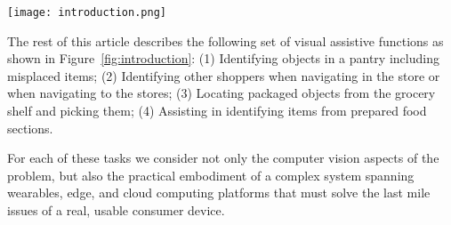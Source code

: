 \begin{figure*}[!htb]
\centering
\texttt{[image: introduction.png]}
\caption{Applications and underlying technologies}
\label{fig:introduction}
\end{figure*} 

The rest of this article describes the following set of visual
assistive functions as shown in Figure~\ref{fig:introduction}:
(1) Identifying objects in a pantry including misplaced items; 
(2) Identifying other shoppers when navigating in the
store or when navigating to the stores; 
(3) Locating packaged objects from the grocery shelf and picking them; 
(4) Assisting in identifying items from prepared food sections. 

For each of these tasks we consider not only the computer vision
aspects of the problem, but also the practical embodiment of a
complex system spanning wearables, edge, and cloud computing
platforms that must solve the last mile issues of a real, usable
consumer device.
